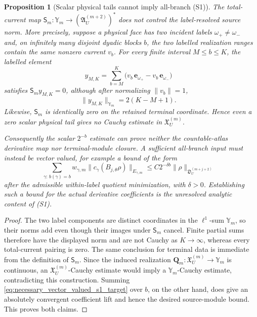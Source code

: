 \documentclass[11pt]{amsart}
\theoremstyle{compactplain}
\newtheorem{proposition}[theorem]{Proposition}
\theoremstyle{compactdefinition}
\theoremstyle{compactremark}
\begin{document}
\begin{proposition}[Scalar physical tails cannot imply all-branch (S1)]
\label{prop:scalar_tail_not_all_branch_s1}
The total-current map
\(\mathsf S_m:\mathbb Y_m\to(\mathfrak A_U^{(m+2)})^*\) does not control the
label-resolved source norm.  More precisely, suppose a physical face has two
incident labels \(\omega_+\ne\omega_-\) and, on infinitely many disjoint
dyadic blocks \(b\), the two labelled realization ranges contain the same
nonzero current \(v_b\).  For every finite interval \(M\le b\le K\), the
labelled element
\[
 y_{M,K}
 =
 \sum_{b=M}^{K}
 \bigl(v_b\,\mathbf e_{\omega_+}
       -v_b\,\mathbf e_{\omega_-}\bigr)
\]
satisfies \(\mathsf S_my_{M,K}=0\), although after normalizing
\(\|v_b\|=1\),
\[
 \|y_{M,K}\|_{\mathbb Y_m}=2(K-M+1).
\]
Likewise, \(\mathsf S_m\) is identically zero on the retained terminal
coordinate.  Hence even a zero scalar physical tail gives no Cauchy estimate
in \(\mathfrak X_U^{(m)}\).

Consequently the scalar \(2^{-b}\) estimate can prove neither the
countable-atlas derivative map nor terminal-module closure.  A sufficient
all-branch input must instead be vector valued, for example a bound of the
form
\begin{equation}
\label{eq:necessary_vector_valued_s1_target}
 \sum_{\gamma:\,b(\gamma)=b}
 w_{\gamma,m}
 \|c_\gamma(B_{j,\theta}\rho)\|_{E_{\gamma,m}}
 \le C2^{-\delta b}\|\rho\|_{\mathfrak D_U^{(m+j+2)}}
\end{equation}
after the admissible within-label quotient minimization, with
\(\delta>0\).  Establishing such a bound for the actual derivative
coefficients is the unresolved analytic content of (S1).
\end{proposition}

\begin{proof}
The two label components are distinct coordinates in the
\(\ell^1\)-sum \(\mathbb Y_m\), so their norms add even though their images
under \(\mathsf S_m\) cancel.  Finite partial sums therefore have the displayed
norm and are not Cauchy as \(K\to\infty\), whereas every total-current pairing
is zero.  The same conclusion for terminal data is immediate from the
definition of \(\mathsf S_m\).  Since the induced realization
\(\mathbf Q_m:\mathfrak X_U^{(m)}\to\mathbb Y_m\) is continuous, an
\(\mathfrak X_U^{(m)}\)-Cauchy estimate would imply a
\(\mathbb Y_m\)-Cauchy estimate, contradicting this construction.  Summing
\eqref{eq:necessary_vector_valued_s1_target} over \(b\), on the other hand,
does give an absolutely convergent coefficient lift and hence the desired
source-module bound.  This proves both claims.
\end{proof}
\end{document}
